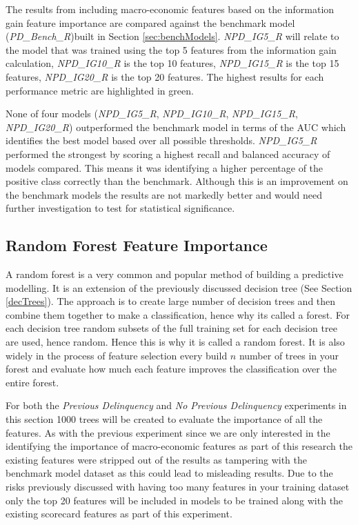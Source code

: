 The results from including macro-economic features based on the information gain feature importance are compared against the benchmark model (\textit{PD\_Bench\_R})built in Section \ref{sec:benchModels}. \textit{NPD\_IG5\_R} will relate to the model that was trained using the top 5 features from the information gain calculation, \textit{NPD\_IG10\_R} is the top 10 features, \textit{NPD\_IG15\_R} is the top 15 features, \textit{NPD\_IG20\_R} is the top 20 features. The highest results for each performance metric are highlighted in green.

None of four models (\textit{NPD\_IG5\_R}, \textit{NPD\_IG10\_R}, \textit{NPD\_IG15\_R}, \textit{NPD\_IG20\_R}) outperformed the benchmark model in terms of the AUC which identifies the best model based over all possible thresholds. \textit{NPD\_IG5\_R} performed the strongest by scoring a highest recall and balanced accuracy of models compared. This means it was identifying a higher percentage of the positive class correctly than the benchmark. Although this is an improvement on the benchmark models the results are not markedly better and would need further investigation to test for statistical significance.

\subsection{Random Forest Feature Importance}
A random forest is a very common and popular method of building a predictive modelling. It is an extension of the previously discussed decision tree (See Section \ref{decTrees}). The approach is to create large number of decision trees and then combine them together to make a classification, hence why its called a forest. For each decision tree random subsets of the full training set for each decision tree are used, hence random. Hence this is why it is called a random forest. It is also widely in the process of feature selection every build $n$ number of trees in your forest and evaluate how much each feature improves the classification over the entire forest. 

For both the \textit{Previous Delinquency} and \textit{No Previous Delinquency} experiments in this section 1000 trees will be created to evaluate the importance of all the features. As with the previous experiment since we are only
interested in the identifying the importance of macro-economic features as part of this
research the existing features were stripped out of the results as tampering with the benchmark model dataset as this could lead to misleading results. Due to the risks previously discussed
with having too many features in your training dataset only the top 20 features will be
included in models to be trained along with the existing scorecard features as part of this experiment.


